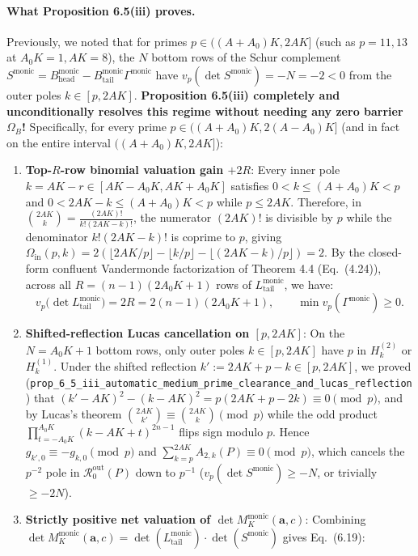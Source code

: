 \documentclass[11pt,a4paper]{article}
\begin{document}
\paragraph{What Proposition 6.5(iii) proves.}
Previously, we noted that for primes $p \in ((A+A_0)K, 2AK]$ (such as $p = 11, 13$ at $A_0 K = 1, AK = 8$), the $N$ bottom rows of the Schur complement $S^{\mathrm{monic}} = B_{\mathrm{head}}^{\mathrm{monic}} - B_{\mathrm{tail}}^{\mathrm{monic}}\Gamma^{\mathrm{monic}}$ have $v_p(\det S^{\mathrm{monic}}) = -N = -2 < 0$ from the outer poles $k \in [p, 2AK]$.
\textbf{Proposition 6.5(iii) completely and unconditionally resolves this regime without needing any zero barrier $\Omega_B$!}
Specifically, for every prime $p \in ((A+A_0)K, 2(A-A_0)K]$ (and in fact on the entire interval $((A+A_0)K, 2AK]$):
\begin{enumerate}
  \item \textbf{Top-$R$-row binomial valuation gain $+2R$}: Every inner pole $k = AK - r \in [AK - A_0 K, AK + A_0 K]$ satisfies $0 < k \le (A+A_0)K < p$ and $0 < 2AK - k \le (A+A_0)K < p$ while $p \le 2AK$. Therefore, in $\binom{2AK}{k} = \frac{(2AK)!}{k!(2AK-k)!}$, the numerator $(2AK)!$ is divisible by $p$ while the denominator $k!(2AK-k)!$ is coprime to $p$, giving $\Omega_{\mathrm{in}}(p, k) = 2(\lfloor 2AK/p \rfloor - \lfloor k/p \rfloor - \lfloor (2AK-k)/p \rfloor) = 2$. By the closed-form confluent Vandermonde factorization of Theorem 4.4 (Eq.\ (4.24)), across all $R = (n-1)(2A_0 K + 1)$ rows of $L_{\mathrm{tail}}^{\mathrm{monic}}$, we have:
  \[
    v_p\big(\det L_{\mathrm{tail}}^{\mathrm{monic}}\big) = 2R = 2(n-1)(2A_0 K + 1), \qquad \min v_p(\Gamma^{\mathrm{monic}}) \ge 0.
  \]
  \item \textbf{Shifted-reflection Lucas cancellation on $[p, 2AK]$}: On the $N = A_0 K + 1$ bottom rows, only outer poles $k \in [p, 2AK]$ have $p$ in $H_k^{(2)}$ or $H_k^{(1)}$. Under the shifted reflection $k' := 2AK + p - k \in [p, 2AK]$, we proved (\texttt{prop\_6\_5\_iii\_automatic\_medium\_prime\_clearance\_and\_lucas\_reflection}) that $(k' - AK)^2 - (k - AK)^2 = p(2AK + p - 2k) \equiv 0 \pmod{p}$, and by Lucas's theorem $\binom{2AK}{k'} \equiv \binom{2AK}{k} \pmod{p}$ while the odd product $\prod_{t=-A_0 K}^{A_0 K}(k - AK + t)^{2n-1}$ flips sign modulo $p$. Hence $g_{k',0} \equiv -g_{k,0} \pmod{p}$ and $\sum_{k=p}^{2AK} A_{2,k}(P) \equiv 0 \pmod{p}$, which cancels the $p^{-2}$ pole in $\mathcal{R}_0^{\mathrm{out}}(P)$ down to $p^{-1}$ ($v_p(\det S^{\mathrm{monic}}) \ge -N$, or trivially $\ge -2N$).
  \item \textbf{Strictly positive net valuation of $\det M_K^{\mathrm{monic}}(\mathbf{a}, c)$}: Combining $\det M_K^{\mathrm{monic}}(\mathbf{a}, c) = \det(L_{\mathrm{tail}}^{\mathrm{monic}}) \cdot \det(S^{\mathrm{monic}})$ gives Eq.\ (6.19):

\end{enumerate}
\end{document}

